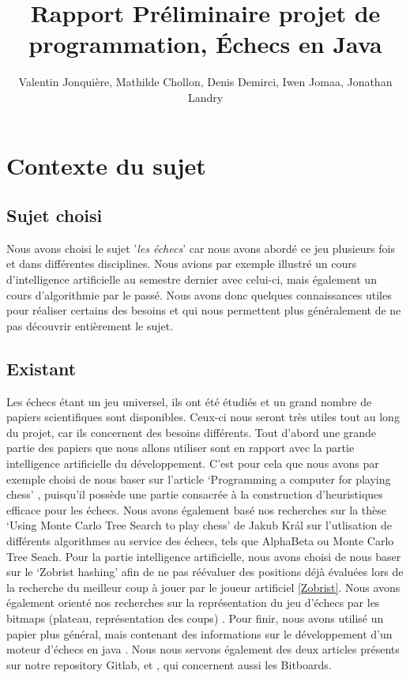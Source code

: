 \documentclass{article}
\author{
    Valentin Jonquière,
    Mathilde Chollon,
    Denis Demirci,
    Iwen Jomaa,
    Jonathan Landry
}
\title{Rapport Préliminaire projet de programmation, Échecs en Java}
\begin{document}
\maketitle

\pagebreak

\tableofcontents

\pagebreak

\section{Contexte du sujet}
\subsection{Sujet choisi}
Nous avons choisi le sujet '\textit{les échecs}' car nous avons abordé ce jeu
plusieurs fois et dans différentes disciplines. Nous avions par exemple illustré un 
cours d'intelligence artificielle au semestre dernier avec celui-ci, mais 
également un cours d'algorithmie par le passé. Nous avons donc quelques connaissances 
utiles pour réaliser certains des besoins et qui nous permettent plus généralement de ne pas
découvrir entièrement le sujet.

\subsection{Existant}
Les échecs étant un jeu universel, ils ont été étudiés et un grand nombre de papiers scientifiques
sont disponibles. Ceux-ci nous seront très utiles tout au long du projet, car ils concernent des
besoins différents. Tout d'abord une grande partie des papiers que nous allons utiliser sont en rapport
avec la partie intelligence artificielle du développement. C'est pour cela que nous avons par exemple
choisi de nous baser sur l'article `Programming a computer for playing chess' \cite{Shannon1950}, 
puisqu'il possède une partie consacrée à la construction d'heuristiques efficace pour les échecs.
Nous avons également basé nos recherches sur la thèse `Using Monte Carlo Tree Search to play chess' \cite{Kral2021}
de Jakub Král sur l'utlisation de différents algorithmes au service des échecs, tels que AlphaBeta ou
Monte Carlo Tree Seach. Pour la partie intelligence artificielle, nous avons choisi de nous baser sur le 
`Zobrist hashing' \cite{ZobristHashing} afin de ne pas réévaluer des positions déjà évaluées lors de la 
recherche du meilleur coup à jouer par le joueur artificiel \ref{Zobrist}. Nous avons également orienté
nos recherches sur la représentation du jeu d'échecs par les bitmaps (plateau, représentation des coups) \cite{Bijl2021}.
Pour finir, nous avons utilisé un papier plus général, mais contenant des informations sur le développement
d'un moteur d'échecs en java \cite{PaulDailly}. Nous nous servons également des deux articles présents sur 
notre repository Gitlab, \cite{Bitboards} et \cite{GameBitboards}, qui concernent aussi les Bitboards.
\end{document}
